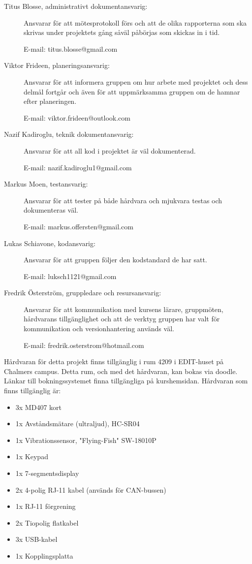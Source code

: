 \documentclass[a4paper]{article}
\begin{document}
\begin{description}
    \item[Titus Blosse, administrativt dokumentansvarig:] Ansvarar för att mötesprotokoll förs och att de olika rapporterna som ska skrivas under projektets gång såväl påbörjas som skickas in i tid.

    E-mail: titus.blosse@gmail.com

    \item[Viktor Frideen, planeringsansvarig:] Ansvarar för att informera gruppen om hur arbete med projektet och dess delmål fortgår och även för att uppmärksamma gruppen om de hamnar efter planeringen.

    E-mail: viktor.frideen@outlook.com

    \item[Nazif Kadiroglu, teknik dokumentansvarig:] Ansvarar för att all kod i projektet är väl dokumenterad.

    E-mail: nazif.kadiroglu1@gmail.com

    \item[Markus Moen, testansvarig:] Ansvarar för att tester på både hårdvara och mjukvara testas och dokumenteras väl.

    E-mail: markus.offersten@gmail.com

    \item[Lukas Schiavone, kodansvarig:] Ansvarar för att gruppen följer den kodstandard de har satt.

    E-mail: luksch1121@gmail.com

    \item[Fredrik Österström, gruppledare och resursansvarig:] Ansvarar för att kommunikation med kursens lärare, gruppmöten, hårdvarans tillgänglighet och att de verktyg gruppen har valt för kommunikation och versionhantering används väl.

    E-mail: fredrik.osterstrom@hotmail.com
\end{description}

Hårdvaran för detta projekt finns tillgänglig i rum 4209 i EDIT-huset på Chalmers campus. Detta rum, och med det hårdvaran, kan bokas via doodle. Länkar till bokningssystemet finna tillgängliga på kurshemsidan. Hårdvaran som finns tillgänglig är:

\begin{itemize}
    \item 3x MD407 kort
    \item 1x Avståndsmätare (ultraljud), HC-SR04
    \item 1x Vibrationssensor, "Flying-Fish" SW-18010P
    \item 1x Keypad
    \item 1x 7-segmentsdisplay
    \item 2x 4-polig RJ-11 kabel (används för CAN-bussen)
    \item 1x RJ-11 förgrening
    \item 2x Tiopolig flatkabel
    \item 3x USB-kabel
    \item 1x Kopplingsplatta
\end{itemize}
\end{document}
